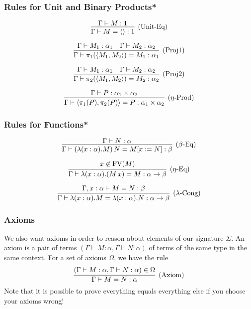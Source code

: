 \documentclass[aspectratio=169]{beamer}
\begin{document}
\begin{frame}
\frametitle{Rules for Unit and Binary Products*}

\[
\infer[\text{(Unit-Eq)}]{\Gamma \vdash M = \langle\rangle : 1}{\Gamma \vdash M : 1}
\]

\[
\infer[\text{(Proj1)}]{\Gamma \vdash \pi_1(\langle M_1, M_2 \rangle) = M_1 : \alpha_1}{\Gamma \vdash M_1 : \alpha_1 & \Gamma \vdash M_2 : \alpha_2}
\]

\[
\infer[\text{(Proj2)}]{\Gamma \vdash \pi_2(\langle M_1, M_2 \rangle) = M_2 : \alpha_2}{\Gamma \vdash M_1 : \alpha_1 & \Gamma \vdash M_2 : \alpha_2}
\]

\[
\infer[\text{($\eta$-Prod)}]{\Gamma \vdash \langle \pi_1(P), \pi_2(P) \rangle = P : \alpha_1 \times \alpha_2}{\Gamma \vdash P : \alpha_1 \times \alpha_2}
\]
\end{frame}

\begin{frame}
\frametitle{Rules for Functions*}

\[
\infer[\text{($\beta$-Eq)}]{\Gamma \vdash (\lambda (x : \alpha). M) \, N = M[x := N] : \beta}{\Gamma \vdash N : \alpha}
\]

\[
\infer[\text{($\eta$-Eq)}]{\Gamma \vdash \lambda (x : \alpha). (M \, x) = M : \alpha \rightarrow \beta}{x \not\in \text{FV}(M)}
\]

\[
\infer[\text{($\lambda$-Cong)}]{\Gamma \vdash \lambda (x : \alpha). M = \lambda (x : \alpha). N : \alpha \rightarrow \beta}{\Gamma, x : \alpha \vdash M = N : \beta}
\]

\end{frame}

\begin{frame}
\frametitle{Axioms}
We also want axioms in order to reason about elements of our signature $\Sigma$.
An axiom is a pair of terms $\left(\Gamma \vdash M : \alpha, \Gamma \vdash N : \alpha\right)$ of terms of the same type in the same context.
For a set of axioms $\Omega$, we have the rule
\[
\infer[\text{(Axiom)}]{\Gamma \vdash M = N : \alpha}{\left(\Gamma \vdash M : \alpha, \Gamma \vdash N : \alpha\right) \in \Omega}
\]
Note that it is possible to prove everything equals everything else if you choose your axioms wrong!
\end{frame}
\end{document}

